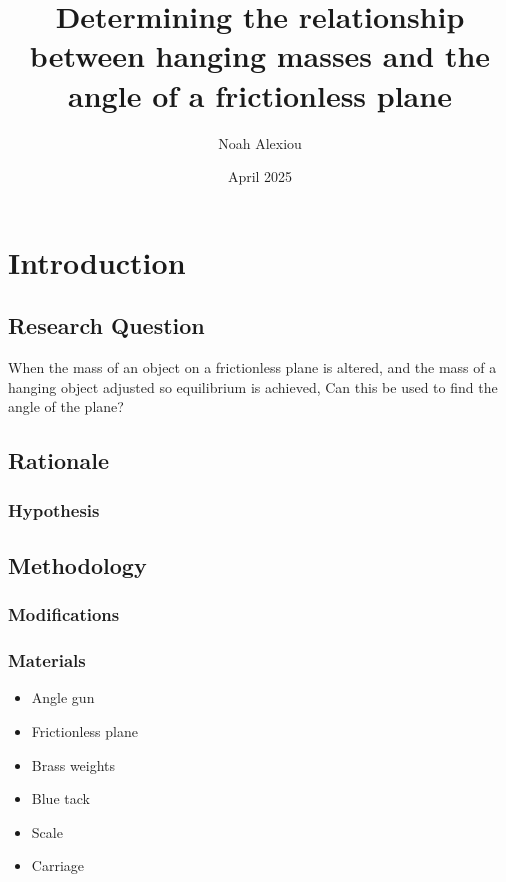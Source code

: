 \documentclass[12pt,a4paper]{article}
\begin{document}
\begin{titlepage}


\title{Determining the relationship between hanging masses and the angle of a frictionless plane}

\author{Noah Alexiou}


\date{April 2025}

\maketitle
\centering

\end{titlepage}
\tableofcontents
\newpage

\section{Introduction}

\subsection{Research Question}
When the mass of an object on a frictionless plane is altered, and the mass of a hanging object adjusted so  equilibrium is achieved, Can this be used to find the angle of the plane?

\subsection{Rationale}

\subsubsection{Hypothesis}

\subsection{Methodology}

\subsubsection{Modifications}

\subsubsection{Materials}
\begin{itemize}
	\item Angle gun 
	\item Frictionless plane
	\item Brass weights
	\item Blue tack 
	\item Scale
	\item Carriage
\end{itemize}
\end{document}
